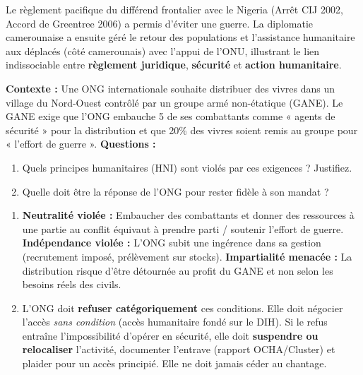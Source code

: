 \documentclass[11pt]{article}
\newcounter{popsec}
\newcounter{popsub}
\newcommand{\courssub}[1]{%
  \stepcounter{popsub}%
  \par\vspace{9pt}\noindent{\popxbold\fontsize{11.5}{13}\selectfont\color{popink}{\color{poporange}\thepopsec.\thepopsub}\hspace{6pt}#1}\par\nopagebreak\vspace{4pt}
}
\begin{document}
\begin{exemplebox}
Le règlement pacifique du différend frontalier avec le Nigeria (Arrêt CIJ 2002, Accord de Greentree 2006) a permis d'éviter une guerre. La diplomatie camerounaise a ensuite géré le retour des populations et l'assistance humanitaire aux déplacés (côté camerounais) avec l'appui de l'ONU, illustrant le lien indissociable entre \textbf{règlement juridique}, \textbf{sécurité} et \textbf{action humanitaire}.
\end{exemplebox}

\courssub{Exercices d'application}

\begin{exercice}
\textbf{Contexte :} Une ONG internationale souhaite distribuer des vivres dans un village du Nord-Ouest contrôlé par un groupe armé non-étatique (GANE). Le GANE exige que l'ONG embauche 5 de ses combattants comme « agents de sécurité » pour la distribution et que 20\% des vivres soient remis au groupe pour « l'effort de guerre ».
\textbf{Questions :}
\begin{enumerate}
    \item Quels principes humanitaires (HNI) sont violés par ces exigences ? Justifiez.
    \item Quelle doit être la réponse de l'ONG pour rester fidèle à son mandat ?
\end{enumerate}
\end{exercice}

\begin{corrige}[Exercice 1]
\begin{enumerate}
    \item \textbf{Neutralité violée :} Embaucher des combattants et donner des ressources à une partie au conflit équivaut à prendre parti / soutenir l'effort de guerre. \textbf{Indépendance violée :} L'ONG subit une ingérence dans sa gestion (recrutement imposé, prélèvement sur stocks). \textbf{Impartialité menacée :} La distribution risque d'être détournée au profit du GANE et non selon les besoins réels des civils.
    \item L'ONG doit \textbf{refuser catégoriquement} ces conditions. Elle doit négocier l'accès \textit{sans condition} (accès humanitaire fondé sur le DIH). Si le refus entraîne l'impossibilité d'opérer en sécurité, elle doit \textbf{suspendre ou relocaliser} l'activité, documenter l'entrave (rapport OCHA/Cluster) et plaider pour un accès principié. Elle ne doit jamais céder au chantage.
\end{enumerate}
\end{corrige}
\end{document}
